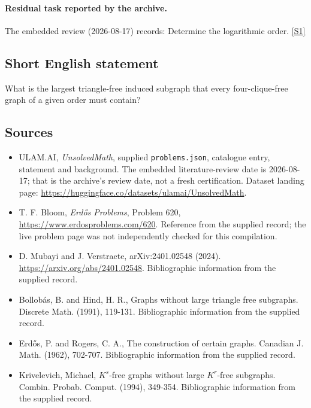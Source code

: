\documentclass[11pt,a4paper]{article}
\newcommand{\sref}[2]{\hyperlink{source:#1:#2}{[S#2]}}
\begin{document}
\paragraph{Residual task reported by the archive.}

The embedded review (2026-08-17) records: Determine the logarithmic order. \sref{statement}{1}

\subsection{Short English statement}

What is the largest triangle-free induced subgraph that every four-clique-free graph of a given order must contain?

\subsection{Sources}

{\small

\begin{itemize}

\item[\hypertarget{source:statement:1}{S1}] ULAM.AI, \emph{UnsolvedMath}, supplied \texttt{problems.json}, catalogue entry, statement and background. The embedded literature-review date is 2026-08-17; that is the archive’s review date, not a fresh certification. Dataset landing page: \url{https://huggingface.co/datasets/ulamai/UnsolvedMath}.

\item[\hypertarget{source:statement:2}{S2}] T. F. Bloom, \emph{Erdős Problems}, Problem 620, \url{https://www.erdosproblems.com/620}. Reference from the supplied record; the live problem page was not independently checked for this compilation.

\item[\hypertarget{source:statement:3}{S3}] D. Mubayi and J. Verstraete, arXiv:2401.02548 (2024). \url{https://arxiv.org/abs/2401.02548}. Bibliographic information from the supplied record.

\item[\hypertarget{source:statement:4}{S4}] Bollob\'{a}s, B. and Hind, H. R., Graphs without large triangle free subgraphs. Discrete Math. (1991), 119-131. Bibliographic information from the supplied record.

\item[\hypertarget{source:statement:5}{S5}] Erd\H{o}s, P. and Rogers, C. A., The construction of certain graphs. Canadian J. Math. (1962), 702-707. Bibliographic information from the supplied record.

\item[\hypertarget{source:statement:6}{S6}] Krivelevich, Michael, {$K^s$}-free graphs without large {$K^r$}-free subgraphs. Combin. Probab. Comput. (1994), 349-354. Bibliographic information from the supplied record.

\end{itemize}

}

\label{end:statement}
\end{document}
